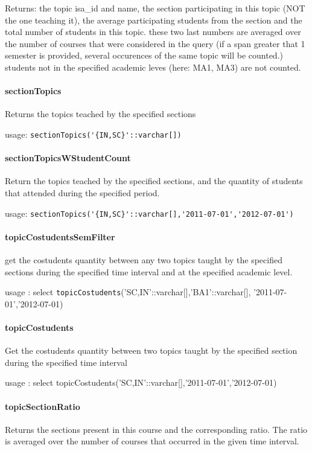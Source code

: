 Returns: the topic isa\_id and name, the section participating in this topic (NOT the one teaching it),
the average participating students from the section and the total number of students in this topic.
these two last numbers are averaged over the number of courses that were considered in the query
(if a span greater that 1 semester is provided, several occurences of the same topic will be counted.) 
students not in the specified academic leves (here: MA1, MA3) are not counted.

\paragraph{sectionTopics} Returns the topics teached by the specified sections

usage: \verb|sectionTopics('{IN,SC}'::varchar[])|

\paragraph{sectionTopicsWStudentCount} Return the topics teached by the specified sections, and the quantity of students that attended during the specified period.

usage: \verb|sectionTopics('{IN,SC}'::varchar[],'2011-07-01','2012-07-01')|

\paragraph{topicCostudentsSemFilter} get the costudents quantity between any two topics taught by the specified sections during the specified time interval and at the specified academic level.

usage : select \verb|topicCostudents|('{SC,IN}'::varchar[],'{BA1}'::varchar[],
'2011-07-01','2012-07-01)

\paragraph{topicCostudents} Get the costudents quantity between two topics taught by the specified section during the specified time interval

usage : select topicCostudents('{SC,IN}'::varchar[],'2011-07-01','2012-07-01)

\paragraph{topicSectionRatio} Returns the sections present in this course and the corresponding ratio. The ratio is averaged over the number of courses that occurred in the given time interval.

